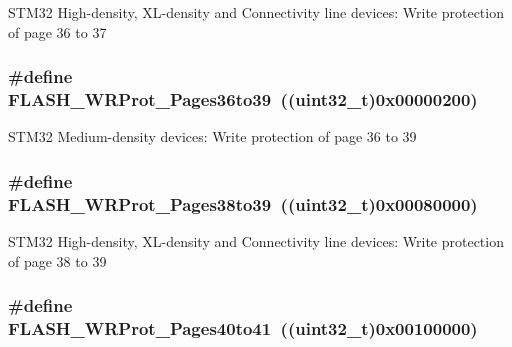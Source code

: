 STM32 High-\/density, XL-\/density and Connectivity line devices: Write protection of page 36 to 37 \hypertarget{group__Option__Bytes__Write__Protection_ga783f47425af52b9a12914520d9ee175e}{
\subsubsection[{FLASH\_\-WRProt\_\-Pages36to39}]{\setlength{\rightskip}{0pt plus 5cm}\#define FLASH\_\-WRProt\_\-Pages36to39~((uint32\_\-t)0x00000200)}}
\label{group__Option__Bytes__Write__Protection_ga783f47425af52b9a12914520d9ee175e}
STM32 Medium-\/density devices: Write protection of page 36 to 39 \hypertarget{group__Option__Bytes__Write__Protection_gacd33bf5c4a305a271da6035ed19cefc2}{
\subsubsection[{FLASH\_\-WRProt\_\-Pages38to39}]{\setlength{\rightskip}{0pt plus 5cm}\#define FLASH\_\-WRProt\_\-Pages38to39~((uint32\_\-t)0x00080000)}}
\label{group__Option__Bytes__Write__Protection_gacd33bf5c4a305a271da6035ed19cefc2}
STM32 High-\/density, XL-\/density and Connectivity line devices: Write protection of page 38 to 39 \hypertarget{group__Option__Bytes__Write__Protection_gaaf0c1391987f76b381d26ff4b5142268}{
\subsubsection[{FLASH\_\-WRProt\_\-Pages40to41}]{\setlength{\rightskip}{0pt plus 5cm}\#define FLASH\_\-WRProt\_\-Pages40to41~((uint32\_\-t)0x00100000)}}
\label{group__Option__Bytes__Write__Protection_gaaf0c1391987f76b381d26ff4b5142268}
